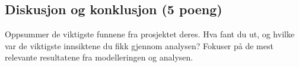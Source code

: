 \subsection{Diskusjon og konklusjon (5 poeng)}\label{diskusjon-og-konklusjon-5-poeng}

Oppsummer de viktigste funnene fra prosjektet deres. Hva fant du ut, og
hvilke var de viktigste innsiktene du fikk gjennom analysen? Fokuser på
de mest relevante resultatene fra modelleringen og analysen.
